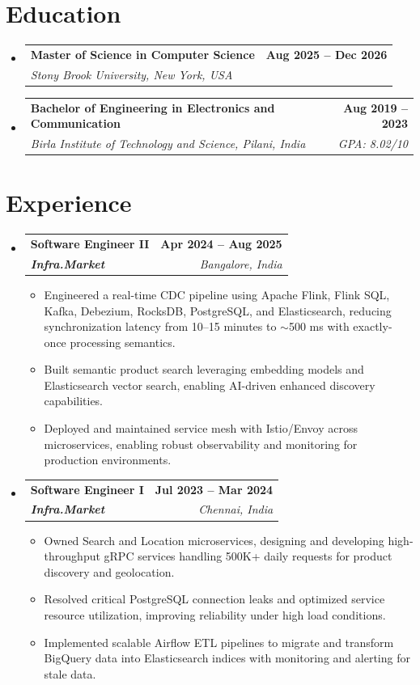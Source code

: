 \documentclass[letterpaper,11pt]{article}
\makeatletter
\newcommand{\resumeItem}[1]{
  \item\small{
    {#1 \vspace{-2pt}}
  }
}
\newcommand{\resumeSubheading}[4]{
  \vspace{-2pt}\item
    \begin{tabular*}{1.0\textwidth}[t]{l@{\extracolsep{\fill}}r}
      \textbf{#1} & \textbf{\small #2} \\
      \textit{\small#3} & \textit{\small #4} \\
    \end{tabular*}\vspace{-7pt}
}
\newcommand{\resumeSubHeadingListStart}{\begin{itemize}[leftmargin=0.0in, label={}]}
\newcommand{\resumeSubHeadingListEnd}{\end{itemize}}
\newcommand{\resumeItemListStart}{\begin{itemize}}
\newcommand{\resumeItemListEnd}{\end{itemize}\vspace{-5pt}}
\makeatother
\begin{document}
\section{Education}
  \resumeSubHeadingListStart
    \resumeSubheading
      {Master of Science in Computer Science}{Aug 2025 -- Dec 2026}
      {Stony Brook University, New York, USA}{}
    \resumeSubheading
      {Bachelor of Engineering in Electronics and Communication}{Aug 2019 -- 2023}
      {Birla Institute of Technology and Science, Pilani, India}{GPA: 8.02/10}
  \resumeSubHeadingListEnd
\vspace{-12pt}

\section{Experience}
  \resumeSubHeadingListStart

    \resumeSubheading
      {\textbf{Software Engineer II}}{Apr 2024 -- Aug 2025}
      {\textbf{Infra.Market}}{Bangalore, India}
      \resumeItemListStart
        \resumeItem{Engineered a real-time CDC pipeline using Apache Flink, Flink SQL, Kafka, Debezium, RocksDB, PostgreSQL, and Elasticsearch, reducing synchronization latency from 10--15 minutes to $\sim$500 ms with exactly-once processing semantics.}
        \resumeItem{Built semantic product search leveraging embedding models and Elasticsearch vector search, enabling AI-driven enhanced discovery capabilities.}
        \resumeItem{Deployed and maintained service mesh with Istio/Envoy across microservices, enabling robust observability and monitoring for production environments.}
      \resumeItemListEnd

    \resumeSubheading
      {\textbf{Software Engineer I}}{Jul 2023 -- Mar 2024}
      {\textbf{Infra.Market}}{Chennai, India}
      \resumeItemListStart
        \resumeItem{Owned Search and Location microservices, designing and developing high-throughput gRPC services handling 500K+ daily requests for product discovery and geolocation.}
        \resumeItem{Resolved critical PostgreSQL connection leaks and optimized service resource utilization, improving reliability under high load conditions.}
        \resumeItem{Implemented scalable Airflow ETL pipelines to migrate and transform BigQuery data into Elasticsearch indices with monitoring and alerting for stale data.}
      \resumeItemListEnd

  \resumeSubHeadingListEnd
\vspace{-12pt}
\end{document}
